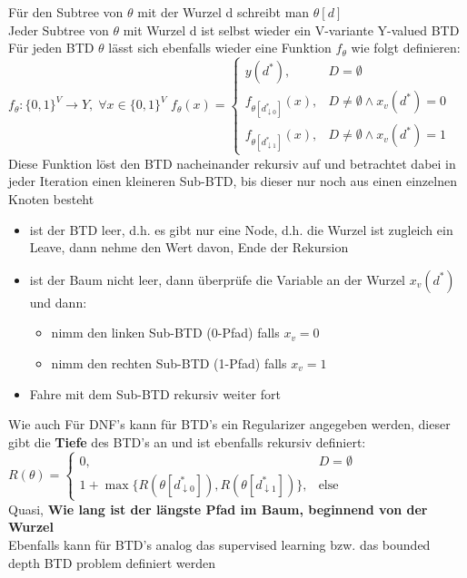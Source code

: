 \documentclass[12pt,a4paper]{article}
\newcommand{\nl}{\\[0.1cm]}
\begin{document}
Für den Subtree von $\theta$ mit der Wurzel d schreibt man $\theta[d]$\\
Jeder Subtree von $\theta$ mit Wurzel d ist selbst wieder ein V-variante Y-valued BTD\nl
Für jeden BTD $\theta$ lässt sich ebenfalls wieder eine Funktion $f_\theta$ wie folgt definieren: $f_\theta : \{0, 1\}^V \rightarrow Y,\; \forall x\in \{0,1\}^V$
$\displaystyle f_\theta(x) = \begin{cases} y(d^*), & D = \emptyset\\
f_{\theta [d^*_{\downarrow 0}]}(x), & D \neq \emptyset \land x_v(d^*) = 0\\
f_{\theta [d^*_{\downarrow 1}]}(x), & D \neq \emptyset \land x_v(d^*) = 1\end{cases}$
Diese Funktion löst den BTD nacheinander rekursiv auf und betrachtet dabei in jeder Iteration einen kleineren Sub-BTD, bis dieser nur noch aus einen einzelnen Knoten besteht
\begin{itemize}
\item ist der BTD leer, d.h. es gibt nur eine Node, d.h. die Wurzel ist zugleich ein Leave, dann nehme den Wert davon, Ende der Rekursion
\item ist der Baum nicht leer, dann überprüfe die Variable an der Wurzel $x_v(d^*)$ und dann:
\begin{itemize}
\item nimm den linken Sub-BTD (0-Pfad) falls $x_v = 0$
\item nimm den rechten Sub-BTD (1-Pfad) falls $x_v = 1$
\end{itemize}
\item Fahre mit dem Sub-BTD rekursiv weiter fort
\end{itemize}
Wie auch Für DNF's kann für BTD's ein Regularizer angegeben werden, dieser gibt die \textbf{Tiefe} des BTD's an und ist ebenfalls rekursiv definiert:\nl
$\displaystyle R(\theta) = \begin{cases}0, & D = \emptyset \\
1+\max\{R(\theta[d^*_{\downarrow 0}]), R(\theta[d^*_{\downarrow 1}])\}, & \text{else}\end{cases}$\nl
Quasi, \textbf{Wie lang ist der längste Pfad im Baum, beginnend von der Wurzel}\nl
Ebenfalls kann für BTD's analog das supervised learning bzw. das bounded depth BTD problem definiert werden
\end{document}
